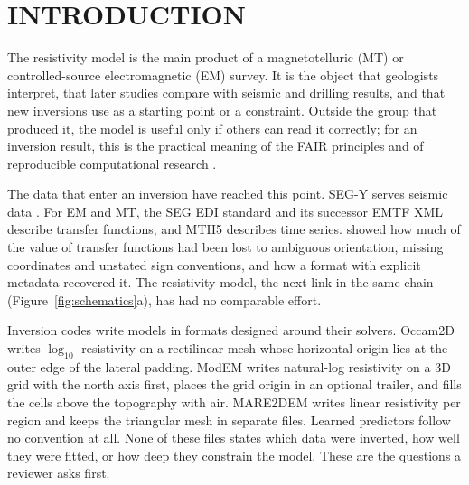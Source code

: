 \documentclass[manuscript]{geophysics}
\begin{document}
\section{INTRODUCTION}

The resistivity model is the main product of a magnetotelluric (MT) or
controlled-source electromagnetic (EM) survey. It is the object that
geologists interpret, that later studies compare with seismic and
drilling results, and that new inversions use as a starting point or a
constraint. Outside the group that produced it, the model is useful
only if others can read it correctly; for an inversion result, this is
the practical meaning of the FAIR principles \citep{Wilkinson2016} and
of reproducible computational research \citep{Sandve2013}.

The data that enter an inversion have reached this point. SEG-Y serves
seismic data \citep{Hagelund2017}. For EM and MT, the SEG EDI standard
\citep{Wight1988} and its successor EMTF XML \citep{Kelbert2020}
describe transfer functions, and MTH5 \citep{Peacock2022MTH5} describes
time series. \citet{Kelbert2020} showed how much of the value of transfer
functions had been lost to ambiguous orientation, missing coordinates
and unstated sign conventions, and how a format with explicit metadata
recovered it. The resistivity model, the next link in the same chain
(Figure~\ref{fig:schematics}a), has had no comparable effort.

Inversion codes write models in formats designed around their solvers.
Occam2D \citep{deGrootHedlin1990} writes $\log_{10}$ resistivity on a
rectilinear mesh whose horizontal origin lies at the outer edge of the
lateral padding. ModEM \citep{Kelbert2014,Egbert2012} writes
natural-log resistivity on a 3D grid with the north axis first, places
the grid origin in an optional trailer, and fills the cells above the
topography with air. MARE2DEM \citep{Key2016} writes linear resistivity
per region and keeps the triangular mesh in separate files. Learned
predictors \citep{Rodriguez2023,Wang2023Prior,Corseri2024} follow no
convention at all. None of these files states which data were inverted,
how well they were fitted, or how deep they constrain the model. These
are the questions a reviewer asks first.
\end{document}
